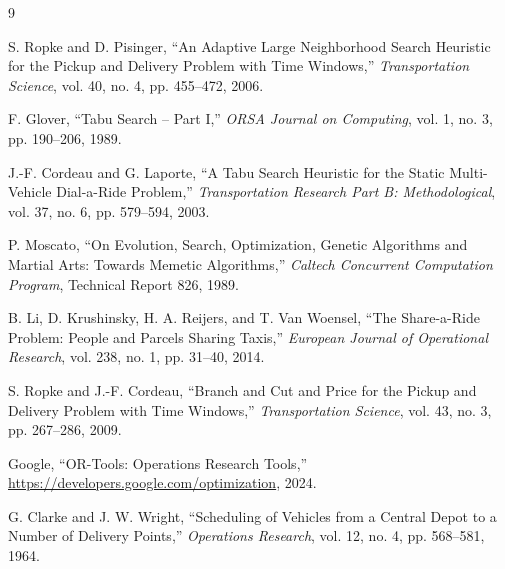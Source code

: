 \documentclass[12pt, a4paper]{article}
\begin{document}
\begin{thebibliography}{9}

S. Ropke and D. Pisinger,
``An Adaptive Large Neighborhood Search Heuristic for the Pickup and Delivery Problem with Time Windows,''
\textit{Transportation Science}, vol. 40, no. 4, pp. 455--472, 2006.

F. Glover,
``Tabu Search -- Part I,''
\textit{ORSA Journal on Computing}, vol. 1, no. 3, pp. 190--206, 1989.

J.-F. Cordeau and G. Laporte,
``A Tabu Search Heuristic for the Static Multi-Vehicle Dial-a-Ride Problem,''
\textit{Transportation Research Part B: Methodological}, vol. 37, no. 6, pp. 579--594, 2003.

P. Moscato,
``On Evolution, Search, Optimization, Genetic Algorithms and Martial Arts: Towards Memetic Algorithms,''
\textit{Caltech Concurrent Computation Program}, Technical Report 826, 1989.

B. Li, D. Krushinsky, H. A. Reijers, and T. Van Woensel,
``The Share-a-Ride Problem: People and Parcels Sharing Taxis,''
\textit{European Journal of Operational Research}, vol. 238, no. 1, pp. 31--40, 2014.

S. Ropke and J.-F. Cordeau,
``Branch and Cut and Price for the Pickup and Delivery Problem with Time Windows,''
\textit{Transportation Science}, vol. 43, no. 3, pp. 267--286, 2009.

Google,
``OR-Tools: Operations Research Tools,''
\url{https://developers.google.com/optimization}, 2024.

G. Clarke and J. W. Wright,
``Scheduling of Vehicles from a Central Depot to a Number of Delivery Points,''
\textit{Operations Research}, vol. 12, no. 4, pp. 568--581, 1964.

\end{thebibliography}
\end{document}
